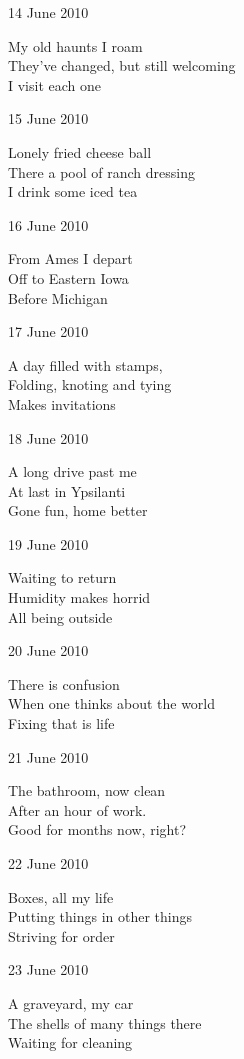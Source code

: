 \documentclass[12pt]{article}
\begin{document}
14 June 2010

My old haunts I roam \\
They've changed, but still welcoming \\
I visit each one

15 June 2010

Lonely fried cheese ball \\
There a pool of ranch dressing \\
I drink some iced tea

16 June 2010

From Ames I depart \\
Off to Eastern Iowa \\
Before Michigan


\newpage

17 June 2010

A day filled with stamps, \\
Folding, knoting and tying \\
Makes invitations

18 June 2010

A long drive past me \\
At last in Ypsilanti \\
Gone fun, home better

19 June 2010

Waiting to return \\
Humidity makes horrid \\
All being outside

20 June 2010

There is confusion \\
When one thinks about the world \\
Fixing that is life

21 June 2010

The bathroom, now clean \\
After an hour of work. \\
Good for months now, right?

22 June 2010

Boxes, all my life \\
Putting things in other things \\
Striving for order

23 June 2010

A graveyard, my car \\
The shells of many things there \\
Waiting for cleaning


\newpage
\end{document}
